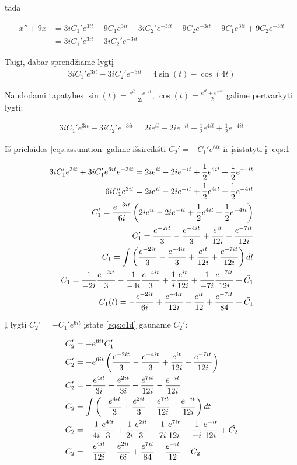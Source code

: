 \documentclass[11pt]{article}
\begin{document}
tada

\begin{align*}
x''+9x&=3iC_1'e^{3it}-9C_1e^{3it}-3iC_2'e^{-3it}-9C_2e^{-3it}+9C_1e^{3it}+9C_2e^{-3it}\\
&=3iC_1'e^{3it}-3iC_2'e^{-3it}
\end{align*}

Taigi, dabar sprendžiame lygtį
\begin{align*}
3iC_1'e^{3it}-3iC_2'e^{-3it}=4\sin(t)-\cos(4t)
\end{align*}

Naudodami tapatybes $\sin(t)=\frac{e^{it}-e^{-it}}{2i}$, $\cos(t)=\frac{e^{it}+e^{-it}}{2}$ galime pertvarkyti lygtį:

\begin{align}
3iC_1'e^{3it}-3iC_2'e^{-3it}=2ie^{it}-2ie^{-it}+\frac{1}{2}e^{4it}+\frac{1}{2}e^{-4it} \label{eqs:1}
\end{align}

Iš prielaidos \eqref{eqs:assumtion} galime išsireikšti $C_2'=-C_1'e^{6it}$ ir įsistatyti į \eqref{eqs:1}

\begin{align}
3iC_1'e^{3it}+3iC_1'e^{6it}e^{-3it}=2ie^{it}-2ie^{-it}+\frac{1}{2}e^{4it}+\frac{1}{2}e^{-4it} \notag\\
6iC_1'e^{3it}=2ie^{it}-2ie^{-it}+\frac{1}{2}e^{4it}+\frac{1}{2}e^{-4it} \notag\\
C_1'=\frac{e^{-3it}}{6i}\left(2ie^{it}-2ie^{-it}+\frac{1}{2}e^{4it}+\frac{1}{2}e^{-4it}\right) \notag\\
C_1'=\frac{e^{-2it}}{3}-\frac{e^{-4it}}{3}+\frac{e^{it}}{12i}+\frac{e^{-7it}}{12i} \label{eqs:c1d}\\
C_1=\int\left(\frac{e^{-2it}}{3}-\frac{e^{-4it}}{3}+\frac{e^{it}}{12i}+\frac{e^{-7it}}{12i}\right)dt \notag\\
C_1=\frac{1}{-2i}\frac{e^{-2it}}{3}-\frac{1}{-4i}\frac{e^{-4it}}{3}+\frac{1}{i}\frac{e^{it}}{12i}+\frac{1}{-7i}\frac{e^{-7it}}{12i}+\tilde{C_1}\notag\\
C_1(t)=-\frac{e^{-2it}}{6i}+\frac{e^{-4it}}{12i}-\frac{e^{it}}{12}+\frac{e^{-7it}}{84}+\tilde{C_1} \label{eqs:c1}
\end{align}

Į lygtį $C_2'=-C_1'e^{6it}$ įstate \eqref{eqs:c1d} gauname $C_2'$:

\begin{align}
C_2'&=-e^{6it}C_1'\notag\\
C_2'&=-e^{6it}\left(\frac{e^{-2it}}{3}-\frac{e^{-4it}}{3}+\frac{e^{it}}{12i}+\frac{e^{-7it}}{12i}\right)\notag\\
C_2'&=-\frac{e^{4it}}{3i}+\frac{e^{2it}}{3i}-\frac{e^{7it}}{12i}-\frac{e^{-it}}{12i}\\
C_2&=\int\left(-\frac{e^{4it}}{3}+\frac{e^{2it}}{3}-\frac{e^{7it}}{12i}-\frac{e^{-it}}{12i}\right)dt\notag\\
C_2&=-\frac{1}{4i}\frac{e^{4it}}{3}+\frac{1}{2i}\frac{e^{2it}}{3}-\frac{1}{7i}\frac{e^{7it}}{12i}-\frac{1}{-i}\frac{e^{-it}}{12i}+\tilde{C_2}\notag\\
C_2&=-\frac{e^{4it}}{12i}+\frac{e^{2it}}{6i}+\frac{e^{7it}}{84}-\frac{e^{-it}}{12}+\tilde{C_2}
\end{align}
\end{document}
